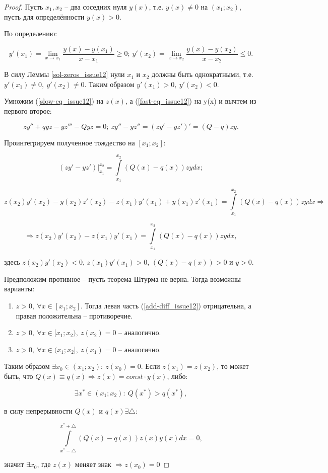 \begin{proof}
Пусть $x_1, x_2$ -- два соседних нуля $y(x)$, т.е. $y(x) \neq 0$ на $(x_1;x_2)$, пусть для определённости $y(x) > 0$.

По определению:

\[y'(x_1) = \lim\limits_{x\rightarrow x_1} \frac{y(x) - y(x_1)}{x - x_1} \geq 0; \: y'(x_2) = \lim\limits_{x\rightarrow x_2} \frac{y(x) - y(x_2)}{x - x_2} \leq 0 .\]

В силу Леммы \ref{sol-zeros_issue12} нули $x_1$ и $x_2$ должны быть однократными, т.е. $y'(x_1) \neq 0, \: y'(x_2) \neq 0$. Таким образом $y'(x_1) > 0, \: y'(x_2) < 0$.

Умножим (\ref{slow-eq_issue12}) на $z(x)$, а (\ref{fast-eq_issue12}) на y(x) и вычтем из первого второе:

\[zy'' + qyz - yz''' - Qyz = 0; \: zy'' - yz'' = (zy'-yz')' = (Q - q)zy.\]

Проинтегрируем полученное тождество на $[x_1;x_2]$:

\[(zy' - yz')\Big\vert_{x_1}^{x_2} = \int\limits_{x_1}^{x_2} (Q(x) - q(x))zydx;\]

\[z(x_2)y'(x_2) - y(x_2)z'(x_2) - z(x_1)y'(x_1) + y(x_1)z'(x_1) = \int\limits_{x_1}^{x_2}(Q(x) - q(x))zydx \Rightarrow\]

\begin{equation}\label{add-diff_issue12} %
\Rightarrow z(x_2)y'(x_2) - z(x_1)y'(x_1) = \int\limits_{x_1}^{x_2}(Q(x) - q(x))zydx,
\end{equation}

здесь $z(x_2)y'(x_2) < 0$, $z(x_1)y'(x_1) > 0$, $(Q(x) - q(x)) > 0$ и $y > 0$.

Предположим противное -- пусть теорема Штурма не верна. Тогда возможны варианты:

\begin{enumerate}
\item $z > 0, \: \forall x \in [x_1;x_2].$ Тогда левая часть (\ref{add-diff_issue12}) отрицательна, а правая положительна -- противоречие.

\item $z > 0, \: \forall x \in [x_1;x_2), \: z(x_2) = 0$ -- аналогично.

\item $z > 0, \: \forall x \in (x_1;x_2], \: z(x_1) = 0$ -- аналогично.
\end{enumerate}

Таким образом $\exists x_0 \in (x_1;x_2): \: z(x_0) = 0$. Если $z(x_1) = z(x_2)$, то может быть, что $Q(x) \equiv q(x) \Rightarrow z(x) = const \cdot y(x)$, либо:

\[\exists x^{*} \in (x_1;x_2): \: Q(x^{*}) > q(x^{*}),\]

в силу непрерывности $Q(x)$ и $q(x) \exists \bigtriangleup:$

\[\int\limits_{x^{*} -\bigtriangleup}^{x^{*} + \bigtriangleup} (Q(x) - q(x))z(x)y(x)dx = 0,\]

значит $\exists x_0$, где $z(x)$ меняет знак $\Rightarrow z(x_0) = 0$
\end{proof}

